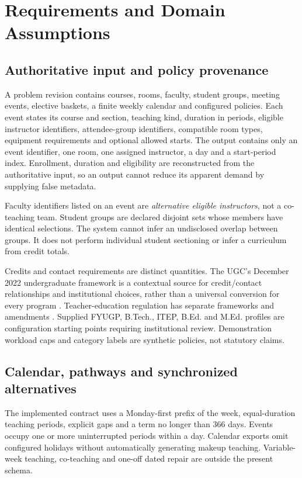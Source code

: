 \documentclass[pdflatex,sn-mathphys-num]{sn-jnl}
\theoremstyle{thmstyleone}
\theoremstyle{thmstyletwo}
\theoremstyle{thmstylethree}
\begin{document}
\section{Requirements and Domain Assumptions}\label{sec:requirements}

\subsection{Authoritative input and policy provenance}

A problem revision contains courses, rooms, faculty, student groups, meeting events, elective baskets, a finite weekly calendar and configured policies. Each event states its course and section, teaching kind, duration in periods, eligible instructor identifiers, attendee-group identifiers, compatible room types, equipment requirements and optional allowed starts. The output contains only an event identifier, one room, one assigned instructor, a day and a start-period index. Enrollment, duration and eligibility are reconstructed from the authoritative input, so an output cannot reduce its apparent demand by supplying false metadata.

Faculty identifiers listed on an event are \emph{alternative eligible instructors}, not a co-teaching team. Student groups are declared disjoint sets whose members have identical selections. The system cannot infer an undisclosed overlap between groups. It does not perform individual student sectioning or infer a curriculum from credit totals.

Credits and contact requirements are distinct quantities. The UGC's December 2022 undergraduate framework is a contextual source for credit/contact relationships and institutional choices, rather than a universal conversion for every program \cite{D10}. Teacher-education regulation has separate frameworks and amendments \cite{D13}. Supplied FYUGP, B.Tech., ITEP, B.Ed. and M.Ed. profiles are configuration starting points requiring institutional review. Demonstration workload caps and category labels are synthetic policies, not statutory claims.

\subsection{Calendar, pathways and synchronized alternatives}

The implemented contract uses a Monday-first prefix of the week, equal-duration teaching periods, explicit gaps and a term no longer than 366 days. Events occupy one or more uninterrupted periods within a day. Calendar exports omit configured holidays without automatically generating makeup teaching. Variable-week teaching, co-teaching and one-off dated repair are outside the present schema.
\end{document}
